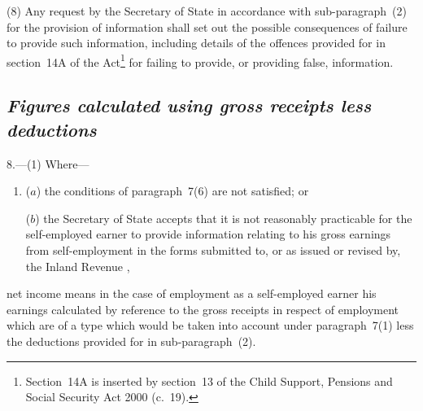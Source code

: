 \documentclass[12pt,a4paper]{article}
\begin{document}
%

(8) Any request by the Secretary of State in accordance with sub-paragraph~(2) for the provision of information shall set out the possible consequences of failure to provide such information, including details of the offences provided for in section~14A of the Act\footnote{Section~14A is inserted by section~13 of the Child Support, Pensions and Social Security Act 2000 (c.\ 19).} for failing to provide, or providing false, information.


\subsection*{\itshape Figures calculated using gross receipts less deductions}

8.---(1)  Where—
\begin{enumerate}\item[]
($a$) the conditions of paragraph~7(6) are not satisfied; or

($b$) the Secretary of State accepts that it is not reasonably practicable for the self-employed earner to provide information relating to his gross earnings from self-employment in the forms submitted to, or as issued or revised by, the Inland Revenue%
%
,
\end{enumerate}
net income means in the case of employment as a self-employed earner his earnings calculated by reference to the gross receipts 
in respect of employment which are of a type which would be taken into account under paragraph~7(1)  %
less the deductions provided for in sub-paragraph~(2).
\end{document}
